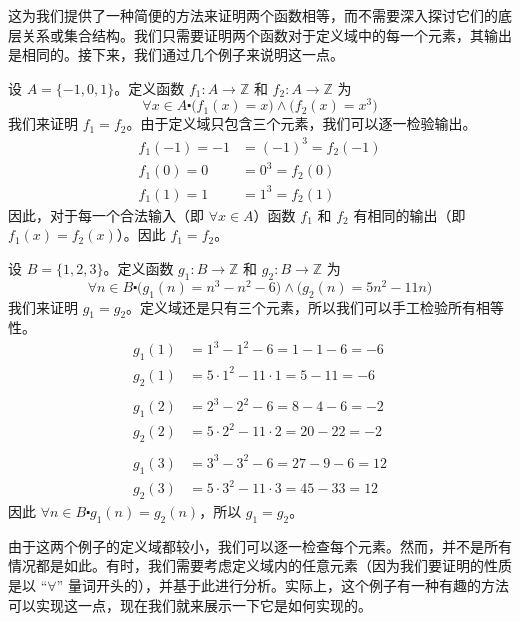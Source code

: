 这为我们提供了一种简便的方法来证明两个函数相等，而不需要深入探讨它们的底层关系或集合结构。我们只需要证明两个函数对于定义域中的每一个元素，其输出是相同的。接下来，我们通过几个例子来说明这一点。\\

\begin{example}
    设 $A = \{-1, 0, 1\}$。定义函数 $f_1 : A \to \mathbb{Z}$ 和 $f_2 : A \to \mathbb{Z}$ 为
    \[\forall x \in A \centerdot \big(f_1(x) = x\big) \land \big(f_2(x) = x^3\big)\]
    我们来证明 $f_1 = f_2$。由于定义域只包含三个元素，我们可以逐一检验输出。
    \begin{align*}
        f_1(-1) = -1 &= (-1)^3 = f_2(-1)\\
        f_1(0) = 0 &= 0^3 = f_2(0)\\
        f_1(1) = 1 &= 1^3 = f_2(1)
    \end{align*}
    因此，对于每一个合法输入（即 $\forall x \in A$）函数 $f_1$ 和 $f_2$ 有相同的输出（即 $f_1(x) = f_2(x)$）。因此 $f_1 = f_2$。
\end{example}

\begin{example}
    设 $B = \{1, 2, 3\}$。定义函数 $g_1 : B \to \mathbb{Z}$ 和 $g_2 : B \to \mathbb{Z}$ 为
    \[\forall n \in B \centerdot \big(g_1(n) = n^3-n^2-6\big) \land \big(g_2(n) = 5n^2-11n\big)\]
    我们来证明 $g_1 = g_2$。定义域还是只有三个元素，所以我们可以手工检验所有相等性。
    \begin{align*}
        g_1(1) &= 1^3 - 1^2 - 6 = 1 - 1 - 6 = -6 \\
        g_2(1) &= 5 \cdot 1^2 - 11 \cdot 1 = 5 - 11 = -6 \\
        \\
        g_1(2) &= 2^3 - 2^2 - 6 = 8 - 4 - 6 = -2 \\
        g_2(2) &= 5 \cdot 2^2 - 11 \cdot 2 = 20 - 22 = -2\\
        \\
        g_1(3) &= 3^3 - 3^2 - 6 = 27 - 9 - 6 = 12 \\
        g_2(3) &= 5 \cdot 3^2 - 11 \cdot 3 = 45 - 33 = 12
    \end{align*}
    因此 $\forall n \in B \centerdot g_1(n) = g_2(n)$，所以 $g_1 = g_2$。
\end{example}

由于这两个例子的定义域都较小，我们可以逐一检查每个元素。然而，并不是所有情况都是如此。有时，我们需要考虑定义域内的任意元素（因为我们要证明的性质是以 ``$\forall$'' 量词开头的），并基于此进行分析。实际上，这个例子有一种有趣的方法可以实现这一点，现在我们就来展示一下它是如何实现的。

